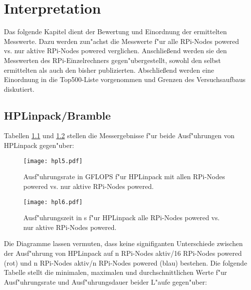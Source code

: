 \chapter{Interpretation}\label{Kapitel 4}

Das folgende Kapitel dient der Bewertung und Einordnung der ermittelten Messwerte. Dazu werden zun"achst die Messwerte f"ur alle RPi-Nodes powered vs. nur aktive RPi-Nodes powered verglichen. Anschlie\ss end werden sie den Messwerten des RPi-Einzelrechners gegen"ubergestellt, sowohl den selbst ermittelten als auch den bisher publizierten. Abschlie\ss end werden eine Einordnung in die Top500-Liste vorgenommen und Grenzen des Versuchsaufbaus diskutiert. 

\section{HPLinpack/Bramble}\label{interpret-linpack}

Tabellen \ref{fig:hpl5} und \ref{fig:hpl6} stellen die Messergebnisse f"ur beide Ausf"uhrungen von HPLinpack gegen"uber: 

\begin{figure}[htb]
  \centering
  \texttt{[image: hpl5.pdf]}\\ 
  \caption{Ausf"uhrungsrate in GFLOPS f"ur HPLinpack mit allen RPi-Nodes powered vs. nur aktive RPi-Nodes powered.}\label{fig:hpl5}
\end{figure}
\newpage
\begin{figure}[htb]
  \centering
  \texttt{[image: hpl6.pdf]}\\ 
  \caption{Ausf"uhrungszeit in s f"ur HPLinpack alle RPi-Nodes powered vs. nur aktive RPi-Nodes powered.}\label{fig:hpl6}
\end{figure}

\noindent
Die Diagramme lassen vermuten, dass keine signifiganten Unterschiede zwischen der Ausf"uhrung von HPLinpack auf n RPi-Nodes aktiv/16 RPi-Nodes powered (rot) und n RPi-Nodes aktiv/n RPi-Nodes powered (blau) bestehen. Die folgende Tabelle stellt die minimalen, maximalen und durchschnittlichen Werte f"ur Ausf"uhrungsrate und Ausf"uhrungsdauer beider L"aufe gegen"uber: 

